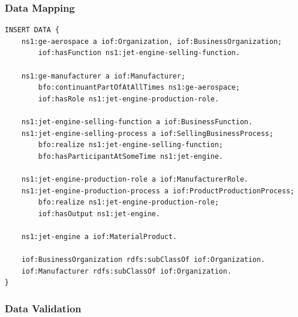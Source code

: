 \subsubsection*{Data Mapping}
\begin{verbatim}
INSERT DATA {
    ns1:ge-aerospace a iof:Organization, iof:BusinessOrganization;
        iof:hasFunction ns1:jet-engine-selling-function.
    
    ns1:ge-manufacturer a iof:Manufacturer;
        bfo:continuantPartOfAtAllTimes ns1:ge-aerospace;
        iof:hasRole ns1:jet-engine-production-role.
    
    ns1:jet-engine-selling-function a iof:BusinessFunction.
    ns1:jet-engine-selling-process a iof:SellingBusinessProcess;
        bfo:realize ns1:jet-engine-selling-function;
        bfo:hasParticipantAtSomeTime ns1:jet-engine.
    
    ns1:jet-engine-production-role a iof:ManufacturerRole.
    ns1:jet-engine-production-process a iof:ProductProductionProcess;
        bfo:realize ns1:jet-engine-production-role;
        iof:hasOutput ns1:jet-engine.
    
    ns1:jet-engine a iof:MaterialProduct.
    
    iof:BusinessOrganization rdfs:subClassOf iof:Organization.
    iof:Manufacturer rdfs:subClassOf iof:Organization.
}
\end{verbatim}



\subsubsection*{Data Validation}
